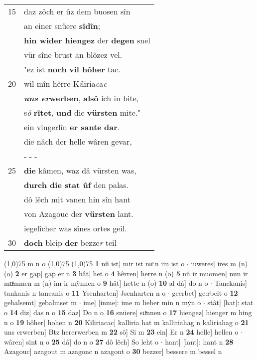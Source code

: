 \documentclass[8pt,a4paper,notitlepage]{article}
\begin{document}
\begin{table}[ht]
\begin{minipage}[t]{0.5\linewidth}
\begin{tabular}{rl}
15 & daz zôch er ûz dem buosen sîn\\ 
 & an einer snüere \textbf{sîdîn};\\ 
 & \textbf{hin wider hiengez} der \textbf{degen} snel\\ 
 & vür sîne brust an blôzez vel.\\ 
 & "ez ist \textbf{noch} \textbf{vil hôher} tac.\\ 
20 & wil mîn hêrre K\textit{i}liria\textit{c}a\textit{c}\\ 
 & \textbf{\textit{uns er}werben}, \textbf{alsô} ich in bite,\\ 
 & s\textit{ô} \textbf{rîtet}, \textbf{und} die \textbf{vürsten} mite."\\ 
 & ein vingerlîn \textbf{er sante} \textbf{dar}.\\ 
 & die nâch der helle wâren gevar,\\ 
 & \multicolumn{1}{l}{ - - - }\\ 
25 & \textbf{die} kâmen, waz dâ vürsten was,\\ 
 & \textbf{durch die stat ûf} den palas.\\ 
 & dô lêch mit vanen hin sîn hant\\ 
 & von Azagouc der \textbf{vürsten} lant.\\ 
 & iegelîcher was sînes ortes geil.\\ 
30 & \textbf{doch} bleip \textbf{der} bezze\textit{r} teil\\ 
\end{tabular}
\scriptsize
\line(1,0){75} \newline
m n o \newline
\line(1,0){75} \newline
\newline
\line(1,0){75} \newline
\textbf{1} nû ist] mir ist nuͦ n im ist o  $\cdot$ iuweres] ires m (n) (o) \textbf{2} er gap] gap er n \textbf{3} hât] het o \textbf{4} hêrren] herre n (o) \textbf{5} nû ir muomen] nun ir muͯmmen m (n) im ir mÿnnen o \textbf{9} hât] hette n (o) \textbf{10} al dâ] do n o  $\cdot$ Tanckanis] tankanis n tancanis o \textbf{11} Ysenharten] Jsenharten n o  $\cdot$ geerbet] ge:rbeit o \textbf{12} gebalsemt] gebalmset m  $\cdot$ ime] [inme]: ime m lieber min n mẏn o  $\cdot$ stât] [hat]: stat o \textbf{14} diz] das n o \textbf{15} daz] Do n o \textbf{16} snüere] suͯnnen o \textbf{17} hiengez] hienger m hing n o \textbf{19} hôher] hohen n \textbf{20} Kiliriacac] kalliria hat m kalliriahag n kaliriahag o \textbf{21} uns erwerben] Btz hererwerben m \textbf{22} sô] Si m \textbf{23} ein] Er n \textbf{24} helle] hellen o  $\cdot$ wâren] sint n o \textbf{25} dâ] do n o \textbf{27} dô lêch] So leht o  $\cdot$ hant] [lant]: hant n \textbf{28} Azagouc] azagout m azagonc n azagont o \textbf{30} bezzer] bessere m bessel n \newline
\end{minipage}
\end{table}
\end{document}
